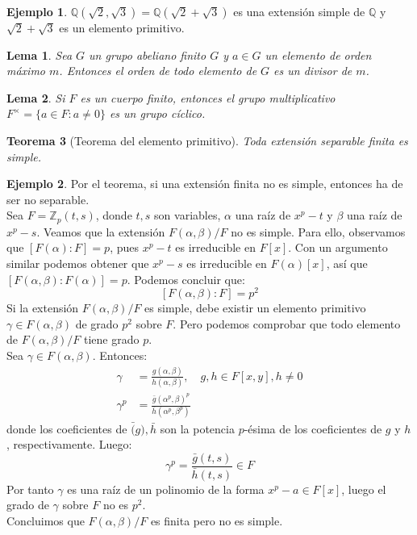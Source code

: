 \documentclass{report}
\newtheorem{theorem}{Teorema}[chapter]
\newtheorem{lemma}[theorem]{Lema}
\theoremstyle{remark}
\theoremstyle{definition}
\theoremstyle{definition}
\theoremstyle{definition}
\newtheorem*{example}{Ejemplo}
\begin{document}
\begin{example}
    $\mathbb{Q}(\sqrt{2}, \sqrt{3}) = \mathbb{Q}(\sqrt{2} + \sqrt{3})$ es una extensión simple de $\mathbb{Q}$ y $\sqrt{2} + \sqrt{3}$ es un elemento primitivo.
\end{example}

\begin{lemma}
    Sea $G$ un grupo abeliano finito $G$ y $a \in G$ un elemento de orden máximo $m$. Entonces el orden de todo elemento de $G$ es un divisor de $m$.
\end{lemma}

\begin{lemma}
    Si $F$ es un cuerpo finito, entonces el grupo multiplicativo $F^\times = \{ a \in F : a \neq 0 \}$ es un grupo cíclico.
\end{lemma}

\begin{theorem}[Teorema del elemento primitivo]
    Toda extensión separable finita es simple.
\end{theorem}

\begin{example}
    Por el teorema, si una extensión finita no es simple, entonces ha de ser no separable.\\
    Sea $F = \mathbb{Z}_p(t, s)$, donde $t, s$ son variables, $\alpha$ una raíz de $x^p-t$ y $\beta$ una raíz de $x^p-s$.
    Veamos que la extensión $F(\alpha, \beta)/F$ no es simple.
    Para ello, observamos que $[F(\alpha) : F] = p$, pues $x^p-t$ es irreducible en $F[x]$.
    Con un argumento similar podemos obtener que $x^p-s$ es irreducible en $F(\alpha)[x]$, así que $[F(\alpha, \beta) : F(\alpha)] = p$.
    Podemos concluir que:
    $$[F(\alpha, \beta) : F] = p^2$$
    Si la extensión $F(\alpha, \beta)/F$ es simple, debe existir un elemento primitivo $\gamma \in F(\alpha, \beta)$ de grado $p^2$ sobre $F$.
    Pero podemos comprobar que todo elemento de $F(\alpha, \beta)/F$ tiene grado $p$.\\
    Sea $\gamma \in F(\alpha, \beta)$. Entonces:
    \begin{align*}
        \gamma   & = \frac{g(\alpha, \beta)}{h(\alpha, \beta)}, \quad g, h \in F[x, y], h \neq 0 \\
        \gamma^p & = \frac{\bar{g}(\alpha^p, \beta)^p}{\bar{h}(\alpha^p, \beta^p)}
    \end{align*}
    donde los coeficientes de $\bar(g), \bar{h}$ son la potencia $p$-ésima de los coeficientes de $g$ y $h$, respectivamente. Luego:
    $$\gamma^p = \frac{\bar{g}(t, s)}{\bar{h}(t, s)} \in F$$
    Por tanto $\gamma$ es una raíz de un polinomio de la forma $x^p - a \in F[x]$, luego el grado de $\gamma$ sobre $F$ no es $p^2$.\\
    Concluimos que $F(\alpha, \beta)/F$ es finita pero no es simple.
\end{example}
\end{document}

